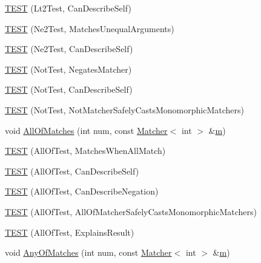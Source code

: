 \begin{DoxyCompactItemize}
\item 
\hyperlink{namespacetesting_1_1gmock__matchers__test_a9f557c4688b2907704650cc18cfd9dcf}{T\+E\+ST} (Lt2\+Test, Can\+Describe\+Self)
\item 
\hyperlink{namespacetesting_1_1gmock__matchers__test_a69692057d2825f6fc8a37265667867c7}{T\+E\+ST} (Ne2\+Test, Matches\+Unequal\+Arguments)
\item 
\hyperlink{namespacetesting_1_1gmock__matchers__test_acedf2eda13385067ee70bdb7d6073427}{T\+E\+ST} (Ne2\+Test, Can\+Describe\+Self)
\item 
\hyperlink{namespacetesting_1_1gmock__matchers__test_ab41b57eeaea5568064b6ed3725316c73}{T\+E\+ST} (Not\+Test, Negates\+Matcher)
\item 
\hyperlink{namespacetesting_1_1gmock__matchers__test_a831db2bf90c3950953cdceaefebddd40}{T\+E\+ST} (Not\+Test, Can\+Describe\+Self)
\item 
\hyperlink{namespacetesting_1_1gmock__matchers__test_a46849e0c019e331f830ed91137fa417a}{T\+E\+ST} (Not\+Test, Not\+Matcher\+Safely\+Casts\+Monomorphic\+Matchers)
\item 
void \hyperlink{namespacetesting_1_1gmock__matchers__test_a51d8731c3824a6acdaa594645dd46779}{All\+Of\+Matches} (int num, const \hyperlink{classtesting_1_1_matcher}{Matcher}$<$ int $>$ \&\hyperlink{variables__e_8js_aab4247b6acebcba996939b177f483c14}{m})
\item 
\hyperlink{namespacetesting_1_1gmock__matchers__test_a7714d041eb2dd2e233db7f175fedef5a}{T\+E\+ST} (All\+Of\+Test, Matches\+When\+All\+Match)
\item 
\hyperlink{namespacetesting_1_1gmock__matchers__test_a31056975d89eea2786997cf18b086bf4}{T\+E\+ST} (All\+Of\+Test, Can\+Describe\+Self)
\item 
\hyperlink{namespacetesting_1_1gmock__matchers__test_a86c15b3bc163321c7a56aeb0b1709b87}{T\+E\+ST} (All\+Of\+Test, Can\+Describe\+Negation)
\item 
\hyperlink{namespacetesting_1_1gmock__matchers__test_a4196a4000390e2378954d55b4f6d2893}{T\+E\+ST} (All\+Of\+Test, All\+Of\+Matcher\+Safely\+Casts\+Monomorphic\+Matchers)
\item 
\hyperlink{namespacetesting_1_1gmock__matchers__test_a2b9f4a791dd4f1fb9f8a1400883a5db4}{T\+E\+ST} (All\+Of\+Test, Explains\+Result)
\item 
void \hyperlink{namespacetesting_1_1gmock__matchers__test_aa4e9deb0a98413e62516451e7c060c7a}{Any\+Of\+Matches} (int num, const \hyperlink{classtesting_1_1_matcher}{Matcher}$<$ int $>$ \&\hyperlink{variables__e_8js_aab4247b6acebcba996939b177f483c14}{m})

\end{DoxyCompactItemize}
